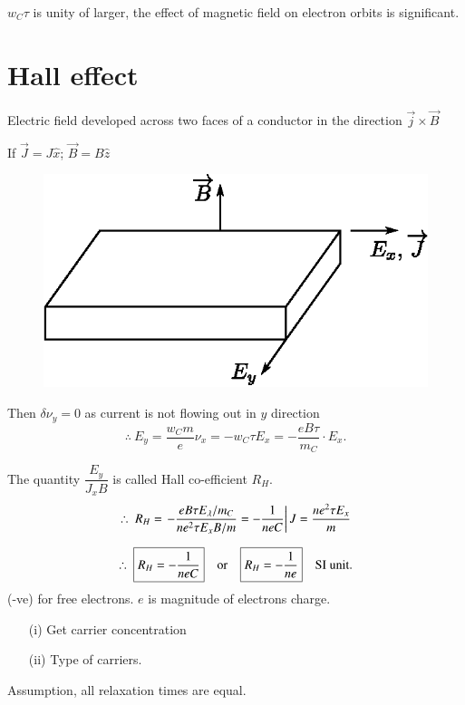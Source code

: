 $w_{C}\tau$ is unity of larger, the effect of magnetic field on electron orbits is significant.

\section*{Hall effect}

Electric field developed across two faces of a conductor in the direction $\overrightarrow{j}\times \overrightarrow{B}$

If $\overrightarrow{J}=J\widehat{x}$; $\overrightarrow{B}=B\widehat{z}$
\begin{figure}[H]
\centering
\includegraphics{images/lecture25/fig2.eps}
\end{figure}

Then $\delta \nu_{y}=0$ as current is not flowing out in $y$ direction
$$
\therefore \ E_{y}=\dfrac{w_{C}m}{e}\nu_{x}=-w_{C}\tau E_{x}=-\dfrac{eB\tau}{m_{C}}\cdot E_{x}.
$$

The quantity $\dfrac{E_{y}}{J_{x}B}$ is called Hall co-efficient $R_{H}$.
\begin{gather*}
\therefore \ R_{H} = \left. -\dfrac{eB\tau E_{\lambda}/m_{C}}{ne^{2}\tau E_{x}B/m}=-\dfrac{1}{neC}\right| J=\dfrac{ne^{2}\tau E_{x}}{m}\\[7pt]
\therefore \ \fbox{$R_{H}=-\dfrac{1}{neC}$}\quad\text{or}\quad \fbox{$R_{H}=-\dfrac{1}{ne}$}\quad \text{SI unit.}
\end{gather*}
(-ve) for free electrons. $e$ is magnitude of electrons charge.
\begin{itemize}
\item[(i)] Get carrier concentration

\item[(ii)] Type of carriers.
\end{itemize}
Assumption, all relaxation times are equal.


